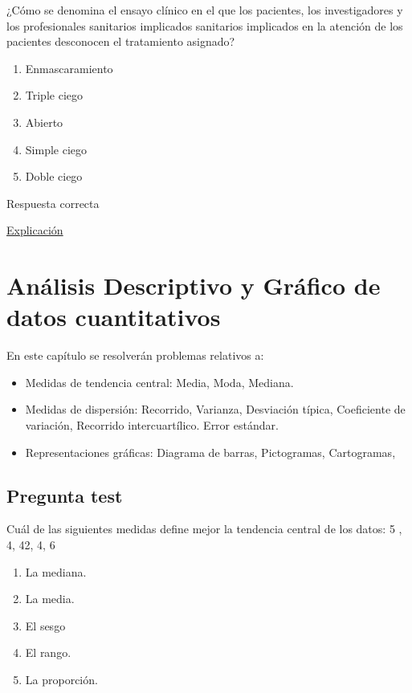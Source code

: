 \documentclass[
]{book}
\providecommand{\tightlist}{%
  \setlength{\itemsep}{0pt}\setlength{\parskip}{0pt}}
\begin{document}
¿Cómo se denomina el ensayo clínico en el que los pacientes, los investigadores y los profesionales sanitarios implicados sanitarios implicados en la atención de los pacientes desconocen el tratamiento asignado?

\begin{enumerate}
\def\labelenumi{\alph{enumi})}
\tightlist
\item
  Enmascaramiento
\item
  Triple ciego
\item
  Abierto
\item
  Simple ciego
\item
  Doble ciego
\end{enumerate}

Respuesta correcta

\href{http://cv.uoc.edu/UOC/a/moduls/90/90_166d/web/main/m4/22d.html}{Explicación}

\hypertarget{anuxe1lisis-descriptivo-y-gruxe1fico-de-datos-cuantitativos}{%
\chapter{Análisis Descriptivo y Gráfico de datos cuantitativos}\label{anuxe1lisis-descriptivo-y-gruxe1fico-de-datos-cuantitativos}}

En este capítulo se resolverán problemas relativos a:

\begin{itemize}
\tightlist
\item
  Medidas de tendencia central: Media, Moda, Mediana.
\item
  Medidas de dispersión: Recorrido, Varianza, Desviación típica, Coeficiente de variación, Recorrido intercuartílico. Error estándar.
\item
  Representaciones gráficas: Diagrama de barras, Pictogramas, Cartogramas,
\end{itemize}

\hypertarget{pregunta-test-40}{%
\section{Pregunta test}\label{pregunta-test-40}}

Cuál de las siguientes medidas define mejor la tendencia central de los datos: 5 , 4, 42, 4, 6

\begin{enumerate}
\def\labelenumi{\alph{enumi})}
\tightlist
\item
  La mediana.
\item
  La media.
\item
  El sesgo
\item
  El rango.
\item
  La proporción.
\end{enumerate}
\end{document}
